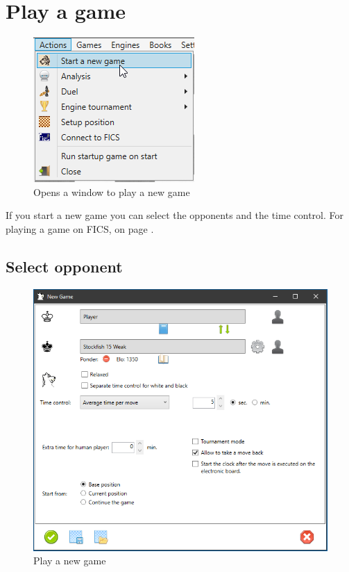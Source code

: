 \documentclass[11pt,a4paper]{article}
\begin{document}
\section{Play a game}

\begin{figure}[H]
	\centering
	\includegraphics[scale=1.0]{NewGame1.png}
	\caption{Opens a window to play a new game}
	\label{fig:NewGame1}
\end{figure}

If you start a new game you can select the opponents and the time control. For playing a game on FICS,  on page \pageref{FICS}.  	

\subsection{Select opponent} \label{SelectOpponent}

\begin{figure}[H]
	\centering
	\includegraphics[scale=0.7]{NewGame2.png}
	\caption{Play a new game}
	\label{fig:NewGame2}
\end{figure}
\end{document}
